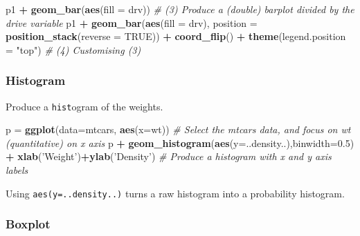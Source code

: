 \documentclass[]{article}
\newenvironment{Shaded}{\begin{snugshade}}{\end{snugshade}}
\newcommand{\CommentTok}[1]{\textcolor[rgb]{0.56,0.35,0.01}{\textit{#1}}}
\newcommand{\DataTypeTok}[1]{\textcolor[rgb]{0.13,0.29,0.53}{#1}}
\newcommand{\FloatTok}[1]{\textcolor[rgb]{0.00,0.00,0.81}{#1}}
\newcommand{\KeywordTok}[1]{\textcolor[rgb]{0.13,0.29,0.53}{\textbf{#1}}}
\newcommand{\NormalTok}[1]{#1}
\newcommand{\OperatorTok}[1]{\textcolor[rgb]{0.81,0.36,0.00}{\textbf{#1}}}
\newcommand{\OtherTok}[1]{\textcolor[rgb]{0.56,0.35,0.01}{#1}}
\newcommand{\StringTok}[1]{\textcolor[rgb]{0.31,0.60,0.02}{#1}}
\begin{document}
\begin{Shaded}
\begin{Highlighting}[]
\NormalTok{p1 }\OperatorTok{+}\StringTok{ }\KeywordTok{geom_bar}\NormalTok{(}\KeywordTok{aes}\NormalTok{(}\DataTypeTok{fill =}\NormalTok{ drv)) }\CommentTok{# (3) Produce a (double) barplot divided by the drive variable}
\NormalTok{p1 }\OperatorTok{+}
\StringTok{ }\KeywordTok{geom_bar}\NormalTok{(}\KeywordTok{aes}\NormalTok{(}\DataTypeTok{fill =}\NormalTok{ drv), }\DataTypeTok{position =} \KeywordTok{position_stack}\NormalTok{(}\DataTypeTok{reverse =} \OtherTok{TRUE}\NormalTok{)) }\OperatorTok{+}
\StringTok{ }\KeywordTok{coord_flip}\NormalTok{() }\OperatorTok{+}
\StringTok{ }\KeywordTok{theme}\NormalTok{(}\DataTypeTok{legend.position =} \StringTok{"top"}\NormalTok{)  }\CommentTok{# (4) Customising (3)}
\end{Highlighting}
\end{Shaded}

\hypertarget{histogram-1}{%
\subsubsection{Histogram}\label{histogram-1}}

Produce a \texttt{hist}ogram of the weights.

\begin{Shaded}
\begin{Highlighting}[]
\NormalTok{p =}\StringTok{ }\KeywordTok{ggplot}\NormalTok{(}\DataTypeTok{data=}\NormalTok{mtcars, }\KeywordTok{aes}\NormalTok{(}\DataTypeTok{x=}\NormalTok{wt))  }\CommentTok{# Select the mtcars data, and focus on wt (quantitative) on x axis}
\NormalTok{p }\OperatorTok{+}\StringTok{ }\KeywordTok{geom_histogram}\NormalTok{(}\KeywordTok{aes}\NormalTok{(}\DataTypeTok{y=}\NormalTok{..density..),}\DataTypeTok{binwidth=}\FloatTok{0.5}\NormalTok{)  }
\OperatorTok{+}\StringTok{ }\KeywordTok{xlab}\NormalTok{(}\StringTok{'Weight'}\NormalTok{)}\OperatorTok{+}\KeywordTok{ylab}\NormalTok{(}\StringTok{'Density'}\NormalTok{) }\CommentTok{# Produce a histogram with x and y axis labels}
\end{Highlighting}
\end{Shaded}

Using \texttt{aes(y=..density..)} turns a raw histogram into a probability histogram.

\hypertarget{boxplot-1}{%
\subsubsection{Boxplot}\label{boxplot-1}}
\end{document}
